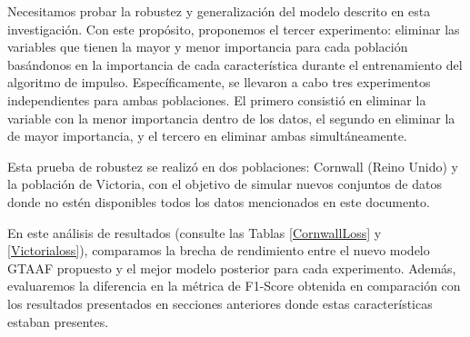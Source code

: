 Necesitamos probar la robustez y generalización del modelo descrito en esta investigación. Con este propósito, proponemos el tercer experimento: eliminar las variables que tienen la mayor y menor importancia para cada población basándonos en la importancia de cada característica durante el entrenamiento del algoritmo de impulso. Específicamente, se llevaron a cabo tres experimentos independientes para ambas poblaciones. El primero consistió en eliminar la variable con la menor importancia dentro de los datos, el segundo en eliminar la de mayor importancia, y el tercero en eliminar ambas simultáneamente.

Esta prueba de robustez se realizó en dos poblaciones: Cornwall (Reino Unido) y la población de Victoria, con el objetivo de simular nuevos conjuntos de datos donde no estén disponibles todos los datos mencionados en este documento.

En este análisis de resultados (consulte las Tablas \ref{CornwallLoss} y \ref{Victorialoss}), comparamos la brecha de rendimiento entre el nuevo modelo GTAAF propuesto y el mejor modelo posterior para cada experimento. Además, evaluaremos la diferencia en la métrica de F1-Score obtenida en comparación con los resultados presentados en secciones anteriores donde estas características estaban presentes.

